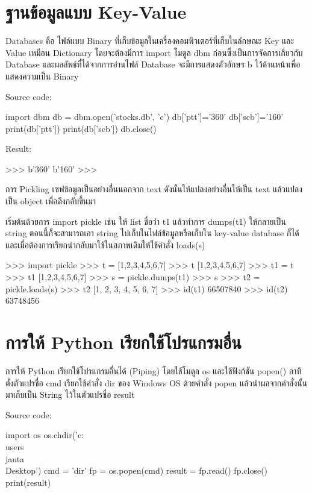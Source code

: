 \section{ฐานข้อมูลแบบ Key-Value}

Databases คือ ไฟล์แบบ Binary ที่เก็บข้อมูลในเครื่องคอมพิวเตอร์ที่เก็บในลักษณะ Key และ Value เหมือน Dictionary โดยจะต้องมีการ import โมดูล dbm ก่อนซึ่งเป็นการจัดการเกี่ยวกับ Database และผลลัพธ์ที่ได้จากการอ่านไฟล์ Database จะมีการแสดงตัวอักษร b ไว้ด้านหน้าเพื่อแสดงความเป็น Binary

Source code:
\begin{codelist}{}{}
import dbm
db = dbm.open('stocks.db', 'c')
db['ptt']='360'
db['scb']='160'
print(db['ptt'])
print(db['scb'])
db.close()
\end{codelist}

Result:
\begin{codelist}{}{}
>>>
b'360'
b'160'
>>>
\end{codelist}


การ Pickling เซฟข้อมูลเป็นอย่างอื่นนอกจาก text ดังนั้นให้แปลงอย่างอื่นให้เป็น text แล้วแปลงเป็น object เพื่อดึงกลับขึ้นมา

เริ่มต้นด้วยการ import pickle เช่น ให้ list ชื่อว่า t1 แล้วทำการ dumps(t1) ให้กลายเป็น string ตอนนี้ก็จะสามารถเอา string ไปเก็บในไฟล์ข้อมูลหรือเก็บใน key-value database ก็ได้ และเมื่อต้องการเรียกนำกลับมาใช้ในสภาพเดิมให้ใช้คำสั่ง loads(s) 

\begin{codelist}{}{}
>>> import pickle
>>> t = [1,2,3,4,5,6,7]
>>> t
[1,2,3,4,5,6,7]
>>> t1 = t
>>> t1
[1,2,3,4,5,6,7]
>>> s = pickle.dumps(t1)
>>> s
>>> t2 = pickle.loads(s)
>>> t2
[1, 2, 3, 4, 5, 6, 7]
>>> id(t1)
66507840
>>> id(t2)
63748456
\end{codelist}



\section{การให้ Python เรียกใช้โปรแกรมอื่น}

การให้ Python เรียกใช้โปรแกรมอื่นได้ (Piping) โดยใช้โมดูล os และใช้ฟังก์ชัน popen()  อาทิ ตั้งตัวแปรชื่อ cmd เรียกใช้คำสั่ง dir ของ Windows OS ด้วยคำสั่ง popen แล้วนำผลจากคำสั่งนั้นมาเก็บเป็น String ไว้ในตัวแปรชื่อ result 

Source code:
\begin{codelist}{}{}
import os
os.chdir('c:\\users\\janta\\Desktop')
cmd = 'dir'
fp = os.popen(cmd)
result = fp.read()
fp.close()
print(result)

\end{codelist}

